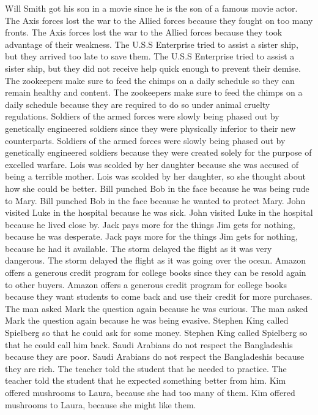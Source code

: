 \documentclass{article}
\begin{document}
\begin{enumerate}
	Will Smith got his son in a movie since he is the son of a famous movie actor.
	The Axis forces lost the war to the Allied forces because they fought on too many fronts.
	The Axis forces lost the war to the Allied forces because they took advantage of their weakness.
	The U.S.S Enterprise tried to assist a sister ship, but they arrived too late to save them.
	The U.S.S Enterprise tried to assist a sister ship, but they did not receive help quick enough to prevent their demise.
	The zookeepers make sure to feed the chimps on a daily schedule so they can remain healthy and content.
	The zookeepers make sure to feed the chimps on a daily schedule because they are required to do so under animal cruelty regulations.
	Soldiers of the armed forces were slowly being phased out by genetically engineered soldiers since they were physically inferior to their new counterparts.
	Soldiers of the armed forces were slowly being phased out by genetically engineered soldiers because they were created solely for the purpose of excelled warfare.
	Lois was scolded by her daughter because she was accused of being a terrible mother.
	Lois was scolded by her daughter, so she thought about how she could be better.
	Bill punched Bob in the face because he was being rude to Mary.
	Bill punched Bob in the face because he wanted to protect Mary.
	John visited Luke in the hospital because he was sick.
	John visited Luke in the hospital because he lived close by.
	Jack pays more for the things Jim gets for nothing, because he was desperate.
	Jack pays more for the things Jim gets for nothing, because he had it available.
	The storm delayed the flight as it was very dangerous.
	The storm delayed the flight as it was going over the ocean.
	Amazon offers a generous credit program for college books since they can be resold again to other buyers.
	Amazon offers a generous credit program for college books because they want students to come back and use their credit for more purchases.
	The man asked Mark the question again because he was curious.
	The man asked Mark the question again because he was being evasive.
	Stephen King called Spielberg so that he could ask for some money.
	Stephen King called Spielberg so that he could call him back.
	Saudi Arabians do not respect the Bangladeshis because they are poor.
	Saudi Arabians do not respect the Bangladeshis because they are rich.
	The teacher told the student that he needed to practice.
	The teacher told the student that he expected something better from him.
	Kim offered mushrooms to Laura, because she had too many of them.
	Kim offered mushrooms to Laura, because she might like them.

\end{enumerate}
\end{document}
